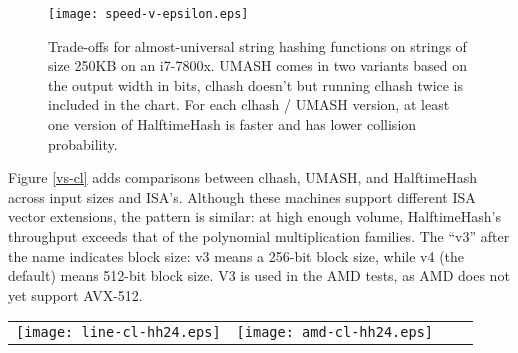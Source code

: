 \documentclass[runningheads]{llncs}
\begin{document}



\begin{figure}
\texttt{[image: speed-v-epsilon.eps]}
\caption{
  \label{frontier}
  Trade-offs for almost-universal string hashing functions on strings of size 250KB on an i7-7800x.
  UMASH comes in two variants based on the output width in bits, clhash doesn't but running clhash twice is included in the chart.
  For each clhash / UMASH version, at least one version of HalftimeHash is faster and has lower collision probability. \protect\cite{layer-of-maxima}
}
\end{figure}

Figure \ref{vs-cl} adds comparisons between clhash, UMASH, and HalftimeHash across input sizes and ISA's.
Although these machines support different ISA vector extensions, the pattern is similar: at high enough volume, HalftimeHash's throughput exceeds that of the polynomial multiplication families.
The ``v3'' after the name indicates block size: v3 means a 256-bit block size, while v4 (the default) means 512-bit block size.
V3 is used in the AMD tests, as AMD does not yet support AVX-512.


\begin{figure*}
\begin{tabular}{cccc}
\texttt{[image: line-cl-hh24.eps]}
&
\texttt{[image: amd-cl-hh24.eps]}
\end{tabular}
\caption{
  \label{vs-cl}
  Comparison of Intel (i7-7800x) and AMD (EC2 c5a.large, 7R32 chip) performance.
  These AMD chips do not support AVX-512, but still HalftimeHash with 256-bit blocks exceeds the speed of clmul-based hashing methods by up to a factor of 2 on long strings.
  In both cases, for long strings, HalftimeHash with 24 bytes of output is faster than clhash and UMASH.
  HalftimeHash24 also has lower collision probability.
}
\end{figure*}
\end{document}
